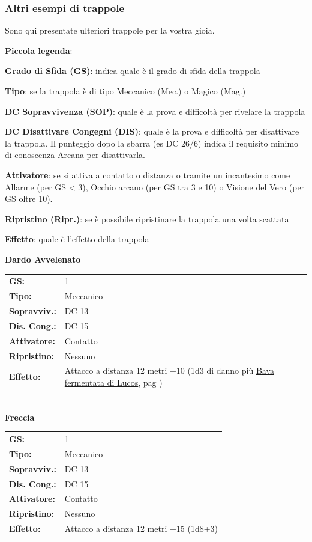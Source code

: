 \begin{multicols}{2}
\subsubsection{Altri esempi di trappole}

Sono qui presentate ulteriori trappole per la vostra gioia.

\medskip

\textbf{Piccola legenda}:

\textbf{Grado di Sfida (GS)}: indica quale è il grado di sfida della trappola

\textbf{Tipo}: se la trappola è di tipo Meccanico (Mec.) o Magico (Mag.)

\textbf{DC Sopravvivenza (SOP)}: quale è la prova e difficoltà per rivelare la trappola

\textbf{DC Disattivare Congegni (DIS)}: quale è la prova e difficoltà per disattivare la trappola. Il punteggio dopo la sbarra (es DC 26/6) indica il requisito minimo di conoscenza Arcana per disattivarla.

\textbf{Attivatore}: se si attiva a contatto o distanza o tramite un incantesimo come Allarme (per GS < 3), Occhio arcano (per GS tra 3 e 10) o Visione del Vero (per GS oltre 10).

\textbf{Ripristino (Ripr.)}: se è possibile ripristinare la trappola una volta scattata

\textbf{Effetto}: quale è l'effetto della trappola

\bigskip

\textbf{Dardo Avvelenato}

\begin{tabularx}{0.48\textwidth}{lX}
	\textbf{GS:} & 1 \\
	\textbf{Tipo:} & Meccanico \\
	\textbf{Sopravviv.:} & DC 13 \\
	\textbf{Dis. Cong.:} & DC 15 \\
	\textbf{Attivatore:} & Contatto \\
	\textbf{Ripristino:} & Nessuno \\
	\textbf{Effetto:} & Attacco a distanza 12 metri +10 (1d3 di danno più \hyperlink{bavadilucos}{Bava fermentata di Lucos}, pag \pageref{bavadilucos})
\end{tabularx}\\

\textbf{Freccia}

\begin{tabularx}{0.48\textwidth}{lX}
	\textbf{GS:} & 1 \\
	\textbf{Tipo:} & Meccanico \\
	\textbf{Sopravviv.:} & DC 13 \\
	\textbf{Dis. Cong.:} & DC 15 \\
	\textbf{Attivatore:} & Contatto \\
	\textbf{Ripristino:} & Nessuno \\
	\textbf{Effetto:} & Attacco a distanza 12 metri +15 (1d8+3)
\end{tabularx}\\


\end{multicols}
